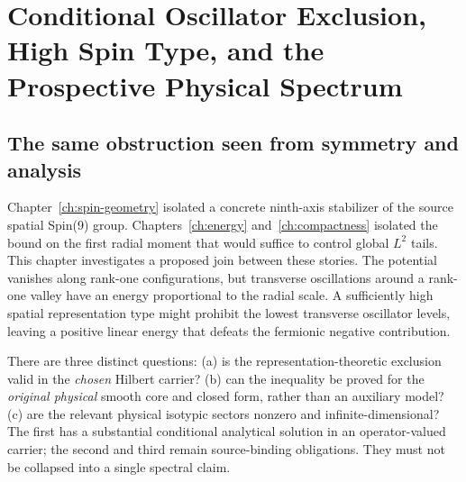 \chapter[Conditional Oscillator Exclusion and Spectrum]{Conditional Oscillator Exclusion, High Spin Type, and the Prospective Physical Spectrum}
\label{ch:spectral}

\section{The same obstruction seen from symmetry and analysis}
Chapter~\ref{ch:spin-geometry} isolated a concrete ninth-axis
stabilizer of the source spatial Spin(9) group. Chapters~\ref{ch:energy}
and~\ref{ch:compactness} isolated the bound on the first radial moment
that would suffice to control global $L^2$ tails. This chapter
investigates a proposed join between these stories. The potential
vanishes along rank-one configurations, but transverse oscillations
around a rank-one valley have an energy proportional to the radial
scale. A sufficiently high spatial representation type might prohibit
the lowest transverse oscillator levels, leaving a positive linear
energy that defeats the fermionic negative contribution.

There are three distinct questions: (a) is the representation-theoretic
exclusion valid in the \emph{chosen} Hilbert carrier? (b) can the
inequality be proved for the \emph{original physical} smooth core and
closed form, rather than an auxiliary model? (c) are the relevant
physical isotypic sectors nonzero and infinite-dimensional? The first
has a substantial conditional analytical solution in an
operator-valued carrier; the second and third remain source-binding
obligations. They must not be collapsed into a single spectral claim.

